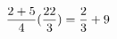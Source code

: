 \documentclass[preview]{standalone}
\begin{document}
\begin{align*}
\special{dvisvgm:raw <g id='unique000'>}\frac{2 + 5}{4} (\frac{22}{3}) = \frac{2}{3} + 9\special{dvisvgm:raw </g>}
\end{align*}
\end{document}
